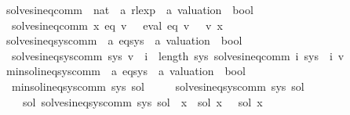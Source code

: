 \begin{isabellebody}
\ solves{\isacharunderscore}{\kern0pt}ineq{\isacharunderscore}{\kern0pt}comm\ {\isacharcolon}{\kern0pt}{\isacharcolon}{\kern0pt}\ {\isachardoublequoteopen}nat\ {\isasymRightarrow}\ {\isacharprime}{\kern0pt}a\ rlexp\ {\isasymRightarrow}\ {\isacharprime}{\kern0pt}a\ valuation\ {\isasymRightarrow}\ bool{\isachardoublequoteclose}\ \isanewline
\ \ {\isachardoublequoteopen}solves{\isacharunderscore}{\kern0pt}ineq{\isacharunderscore}{\kern0pt}comm\ x\ eq\ v\ {\isasymequiv}\ {\isasymPsi}\ {\isacharparenleft}{\kern0pt}eval\ eq\ v{\isacharparenright}{\kern0pt}\ {\isasymsubseteq}\ {\isasymPsi}\ {\isacharparenleft}{\kern0pt}v\ x{\isacharparenright}{\kern0pt}{\isachardoublequoteclose}\isanewline
\isanewline
{}\isamarkupfalse%
\ solves{\isacharunderscore}{\kern0pt}ineq{\isacharunderscore}{\kern0pt}sys{\isacharunderscore}{\kern0pt}comm\ {\isacharcolon}{\kern0pt}{\isacharcolon}{\kern0pt}\ {\isachardoublequoteopen}{\isacharprime}{\kern0pt}a\ eq{\isacharunderscore}{\kern0pt}sys\ {\isasymRightarrow}\ {\isacharprime}{\kern0pt}a\ valuation\ {\isasymRightarrow}\ bool{\isachardoublequoteclose}\ \isanewline
\ \ {\isachardoublequoteopen}solves{\isacharunderscore}{\kern0pt}ineq{\isacharunderscore}{\kern0pt}sys{\isacharunderscore}{\kern0pt}comm\ sys\ v\ {\isasymequiv}\ {\isasymforall}i\ {\isacharless}{\kern0pt}\ length\ sys{\isachardot}{\kern0pt}\ solves{\isacharunderscore}{\kern0pt}ineq{\isacharunderscore}{\kern0pt}comm\ i\ {\isacharparenleft}{\kern0pt}sys\ {\isacharbang}{\kern0pt}\ i{\isacharparenright}{\kern0pt}\ v{\isachardoublequoteclose}\isanewline
\isanewline
{}\isamarkupfalse%
\ min{\isacharunderscore}{\kern0pt}sol{\isacharunderscore}{\kern0pt}ineq{\isacharunderscore}{\kern0pt}sys{\isacharunderscore}{\kern0pt}comm\ {\isacharcolon}{\kern0pt}{\isacharcolon}{\kern0pt}\ {\isachardoublequoteopen}{\isacharprime}{\kern0pt}a\ eq{\isacharunderscore}{\kern0pt}sys\ {\isasymRightarrow}\ {\isacharprime}{\kern0pt}a\ valuation\ {\isasymRightarrow}\ bool{\isachardoublequoteclose}\ \isanewline
\ \ {\isachardoublequoteopen}min{\isacharunderscore}{\kern0pt}sol{\isacharunderscore}{\kern0pt}ineq{\isacharunderscore}{\kern0pt}sys{\isacharunderscore}{\kern0pt}comm\ sys\ sol\ {\isasymequiv}\isanewline
\ \ \ \ solves{\isacharunderscore}{\kern0pt}ineq{\isacharunderscore}{\kern0pt}sys{\isacharunderscore}{\kern0pt}comm\ sys\ sol\ {\isasymand}\isanewline
\ \ \ \ {\isacharparenleft}{\kern0pt}{\isasymforall}sol{\isacharprime}{\kern0pt}{\isachardot}{\kern0pt}\ solves{\isacharunderscore}{\kern0pt}ineq{\isacharunderscore}{\kern0pt}sys{\isacharunderscore}{\kern0pt}comm\ sys\ sol{\isacharprime}{\kern0pt}\ {\isasymlongrightarrow}\ {\isacharparenleft}{\kern0pt}{\isasymforall}x{\isachardot}{\kern0pt}\ {\isasymPsi}\ {\isacharparenleft}{\kern0pt}sol\ x{\isacharparenright}{\kern0pt}\ {\isasymsubseteq}\ {\isasymPsi}\ {\isacharparenleft}{\kern0pt}sol{\isacharprime}{\kern0pt}\ x{\isacharparenright}{\kern0pt}{\isacharparenright}{\kern0pt}{\isacharparenright}{\kern0pt}{\isachardoublequoteclose}%

\end{isabellebody}

